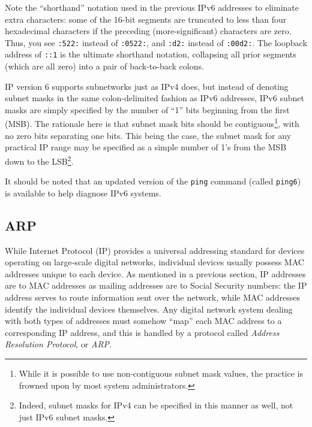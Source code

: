 Note the ``shorthand'' notation used in the previous IPv6 addresses to eliminate extra characters: some of the 16-bit segments are truncated to less than four hexadecimal characters if the preceding (more-significant) characters are zero.  Thus, you see \texttt{:522:} instead of \texttt{:0522:}, and \texttt{:d2:} instead of \texttt{:00d2:}.  The loopback address of \texttt{::1} is the ultimate shorthand notation, collapsing all prior segments (which are all zero) into a pair of back-to-back colons.  

\vskip 10pt

IP version 6 supports subnetworks just as IPv4 does, but instead of denoting subnet masks in the same colon-delimited fashion as IPv6 addresses, IPv6 subnet masks are simply specified by the number of ``1'' bits beginning from the first (MSB).  The rationale here is that subnet mask bits should be contiguous\footnote{While it is possible to use non-contiguous subnet mask values, the practice is frowned upon by most system administrators.}, with no zero bits separating one bits.  This being the case, the subnet mask for any practical IP range may be specified as a simple number of 1's from the MSB down to the LSB\footnote{Indeed, subnet masks for IPv4 can be specified in this manner as well, not just IPv6 subnet masks.}.

\vskip 10pt

It should be noted that an updated version of the \texttt{ping} command (called \texttt{ping6}) is available to help diagnose IPv6 systems.  







\filbreak
\subsection{ARP}

While Internet Protocol (IP) provides a universal addressing standard for devices operating on large-scale digital networks, individual devices usually possess MAC addresses unique to each device.  As mentioned in a previous section, IP addresses are to MAC addresses as mailing addresses are to Social Security numbers: the IP address serves to route information sent over the network, while MAC addresses identify the individual devices themselves.  Any digital network system dealing with both types of addresses must somehow ``map'' each MAC address to a corresponding IP address, and this is handled by a protocol called \textit{Address Resolution Protocol}, or \textit{ARP}.    

